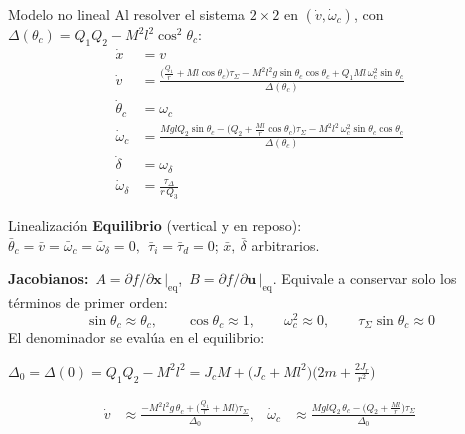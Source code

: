 \documentclass[10pt,aspectratio=169]{beamer}
\newcommand{\tS}{\tau_\Sigma}           %
\newcommand{\tD}{\tau_\Delta}           %
\newcommand{\sth}{\sin\theta_c}
\newcommand{\cth}{\cos\theta_c}
\newcommand{\vx}{\mathbf{x}}
\newcommand{\vu}{\mathbf{u}}
\newcommand{\resaltar}[1]{\begin{center}\colorbox{celeste}{$\displaystyle #1$}\end{center}}
\begin{document}
\begin{frame}{Modelo no lineal}
Al resolver el sistema $2\times2$ en $(\dot v,\dot\omega_c)$, con
$\Delta(\theta_c)=Q_1Q_2-M^2l^2\cos^2\theta_c$:
\begin{align*}
  \dot x &= v\\
  \dot v &= \frac{\big(\tfrac{Q_1}{r}+Ml\cth\big)\tS-M^2l^2g\sth\cth+Q_1Ml\,\omega_c^2\sth}{\Delta(\theta_c)}\\
  \dot\theta_c &= \omega_c\\
  \dot\omega_c &= \frac{MglQ_2\sth-\big(Q_2+\tfrac{Ml}{r}\cth\big)\tS-M^2l^2\,\omega_c^2\sth\cth}{\Delta(\theta_c)}\\
  \dot\delta &= \omega_\delta\\
  \dot\omega_\delta &= \frac{\tD}{r\,Q_3}
\end{align*}
\end{frame}

\begin{frame}{Linealización}
\textbf{Equilibrio} (vertical y en reposo):\quad
$\bar\theta_c=\bar v=\bar\omega_c=\bar\omega_\delta=0,\ \ \bar\tau_i=\bar\tau_d=0$;\quad
$\bar x,\ \bar\delta$ arbitrarios.

\medskip
\textbf{Jacobianos:}\
$A=\partial f/\partial \vx\,\big|_{\text{eq}}$,\
$B=\partial f/\partial \vu\,\big|_{\text{eq}}$.
Equivale a conservar solo los términos de primer orden:
\[
  \sin\theta_c\approx\theta_c,\qquad \cos\theta_c\approx1,\qquad
  \omega_c^2\approx 0,\qquad \tS\sth\approx0
\]
El denominador se evalúa en el equilibrio:
\resaltar{\Delta_0=\Delta(0)=Q_1Q_2-M^2l^2
  = J_cM+\big(J_c+Ml^2\big)\Big(2m+\frac{2J_r}{r^2}\Big)}
\begin{align*}
  \dot v &\approx \frac{-M^2l^2g\,\theta_c+\big(\tfrac{Q_1}{r}+Ml\big)\tS}{\Delta_0},&
  \dot\omega_c &\approx \frac{MglQ_2\,\theta_c-\big(Q_2+\tfrac{Ml}{r}\big)\tS}{\Delta_0}
\end{align*}
\end{frame}
\end{document}
